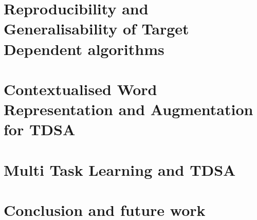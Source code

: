 \documentclass[11pt]{report}
\begin{document}
\chapter{Reproducibility and Generalisability of Target Dependent algorithms}
\label{chapter:reproducibility}

\chapter{Contextualised Word Representation and Augmentation for TDSA}

\chapter{Multi Task Learning and TDSA}
\chapter{Conclusion and future work}



\printbibliography
\end{document}
